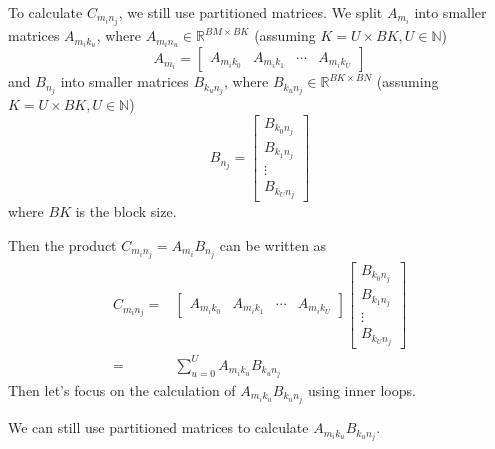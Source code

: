 \documentclass{article}
\begin{document}
To calculate $C_{m_in_j}$, we still use partitioned matrices.
We split $A_{m_i}$ into smaller matrices $A_{m_ik_u}$,
where $A_{m_in_u} \in \mathbb{R}^{BM\times BK}$
(assuming $K=U\times BK, U\in \mathbb{N}$)
\begin{equation}
    A_{m_i}=
    \begin{bmatrix}
        A_{m_ik_0} & A_{m_ik_1} & \cdots & A_{m_ik_{U}}
    \end{bmatrix}
\end{equation}
and $B_{n_j}$ into smaller matrices $B_{k_un_j}$,
where $B_{k_un_j} \in \mathbb{R}^{BK\times BN}$
(assuming $K=U\times BK, U\in \mathbb{N}$)
\begin{equation}
    B_{n_j}=
    \begin{bmatrix}
        B_{k_0n_j} \\
        B_{k_1n_j} \\
        \vdots     \\
        B_{k_{U}n_j}
    \end{bmatrix}
\end{equation}
where $BK$ is the block size.

Then the product $C_{m_in_j}=A_{m_i}B_{n_j}$ can be written as
\begin{equation}
    \begin{aligned}
        C_{m_in_j}= &
        \begin{bmatrix}
            A_{m_ik_0} & A_{m_ik_1} & \cdots & A_{m_ik_{U}}
        \end{bmatrix}
        \begin{bmatrix}
            B_{k_0n_j} \\
            B_{k_1n_j} \\
            \vdots     \\
            B_{k_{U}n_j}
        \end{bmatrix}
        \\
        =           &
        \sum_{u=0}^{U} A_{m_ik_u}B_{k_un_j}
    \end{aligned}
    \label{C_s=sum_As_Bs}
\end{equation}
Then let's focus on the calculation of
$A_{m_ik_u}B_{k_un_j}$
using inner loops.

We can still use partitioned matrices to calculate
$
    A_{m_ik_u}B_{k_un_j}
$.
\end{document}

